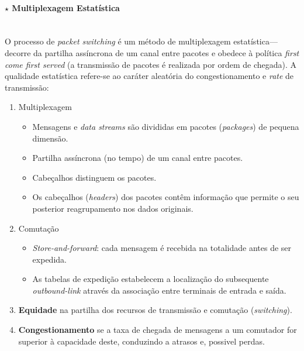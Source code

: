 \paragraph[1.2.2.3 Multiplexagem Estatística]{$\pmb{\star}$ Multiplexagem Estatística}\mbox{}\\[4pt]
\noindent O processo de \textit{packet switching} é um método de multiplexagem estatística---decorre da partilha assíncrona de um canal entre pacotes e obedece à política \textit{first come first served} (a transmissão de pacotes é realizada por ordem de chegada). A qualidade estatística refere-se ao caráter aleatória do congestionamento e \textit{rate} de transmissão:

{

\begin{mdframed}
    \begin{enumerate}[label=$\blacktriangle$]
        \item Multiplexagem
    
            \vspace{-0.75em}
            \begin{itemize}
                \item Mensagens e \textit{data streams} são divididas em pacotes (\textit{packages}) de pequena dimensão.
                \item Partilha assíncrona (no tempo) de um canal entre pacotes.
                \item Cabeçalhos distinguem os pacotes.
                \item Os cabeçalhos (\textit{headers}) dos pacotes contêm informação que permite o seu
                posterior reagrupamento nos dados originais.
            \end{itemize}
        \item Comutação
    
            \vspace{-0.75em}
            \begin{itemize}
                \item \textit{Store-and-forward}: cada mensagem é recebida na
                totalidade antes de ser expedida.
                \item As tabelas de expedição estabelecem a localização do subsequente \textit{outbound-link} através da associação entre terminais de entrada e saída.
            \end{itemize}
        \item \textbf{Equidade} na partilha dos recursos de transmissão e comutação (\textit{switching}).
        \item \textbf{Congestionamento} se a taxa de chegada de mensagens a um comutador for
    superior à capacidade deste, conduzindo a atrasos e, possivel perdas.
    \end{enumerate}%
\end{mdframed}
}

